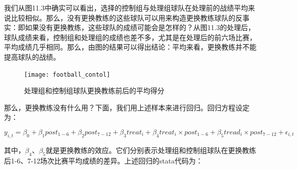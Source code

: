 \documentclass[cn,12pt,math=newtx,citestyle=gb7714-2015,bibstyle=gb7714-2015]{elegantbook}
\begin{document}
	    我们从图11.3中确实可以看出，选择的控制组与处理组球队在处理前的战绩平均来说比较相似。那么，没有更换教练的这些球队可以用来构造更换教练球队的反事实：即如果没有更换教练，这些球队的成绩可能会是怎样的？从图11.3的处理后，球队成绩来看，控制组和处理组的成绩也差不多，尤其是在处理后的前六场比赛，平均成绩几乎相同。那么，由图的结果可以得出结论：平均来看，更换教练并不能提高球队的战绩。
	    
	    \begin{figure}[tbph]
	    	\centering
	    	\texttt{[image: football\_contol]}
	    	\caption{处理组和控制组球队更换教练前后的平均得分}
	    	\label{fig:footballcontrol}
	    \end{figure}
	    
	    那么，更换教练没有什么用？下面，我们用上述样本来进行回归。回归方程设定为：
	    
	    \begin{equation}
	    	y_{i,t}=\beta_0+\beta_1post_{1-6}+\beta_2post_{7-12}+\beta_3 treat_i +\beta_4 treat_i \times post_{1-6}+\beta_5 tread_i \times post_{7-12}+\epsilon_{i,t}
	    \end{equation}
	    
	    其中，$\beta_4、\beta_5$就是更换教练的效应。它们分别表示处理组和控制组球队在更换教练后1-6、7-12场次比赛平均成绩的差异。上述回归的stata代码为：
	    
\end{document}
